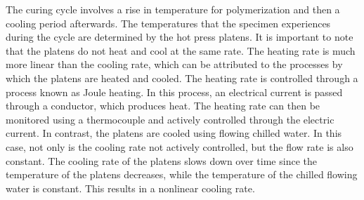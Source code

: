 
The curing cycle involves a rise in temperature for polymerization and then a cooling period afterwards. The temperatures that the specimen experiences during the cycle are determined by the hot press platens. It is important to note that the platens do not heat and cool at the same rate. The heating rate is much more linear than the cooling rate, which can be attributed to the processes by which the platens are heated and cooled. The heating rate is controlled through a process known as Joule heating. In this process, an electrical current is passed through a conductor, which produces heat. The heating rate can then be monitored using a thermocouple and actively controlled through the electric current. In contrast, the platens are cooled using flowing chilled water. In this case, not only is the cooling rate not actively controlled, but the flow rate is also constant. The cooling rate of the platens slows down over time since the temperature of the platens decreases, while the temperature of the chilled flowing water is constant. This results in a nonlinear cooling rate.